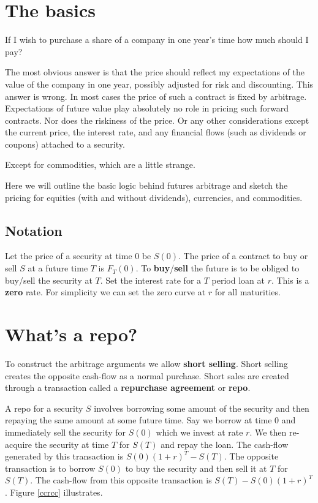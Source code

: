 
\section{The basics}

If I wish to purchase a share of a company in one year's time how much should I pay? 

The most obvious answer is that the price should reflect my expectations of the value of the company in one year, possibly adjusted for risk and discounting. This answer is wrong. In most cases the price of such a contract is fixed by arbitrage. Expectations of future value play absolutely no role in pricing such forward contracts. Nor does the riskiness of the price. Or any other considerations except the current price, the interest rate, and any financial flows (such as dividends or coupons) attached to a security.

Except for commodities, which are a little strange. 

Here we will outline the basic logic behind futures arbitrage and sketch the pricing for equities (with and without dividends), currencies, and commodities. 

\subsection{Notation}
Let the price of a security at time $0$ be $S(0)$. The price of a contract to buy or sell $S$ at a future time $T$ is $F_T(0)$. To \textbf{buy}/\textbf{sell} the future is to be obliged to buy/sell the security at $T$. Set the interest rate for a $T$ period loan at $r$. This is a \textbf{zero} rate. For simplicity we can set the zero curve at $r$ for all maturities. 

\section{What's a repo?}
To construct the arbitrage arguments we allow \textbf{short selling}. Short selling creates the opposite cash-flow as a normal purchase. Short sales are created through a transaction called a \textbf{repurchase agreement} or \textbf{repo}. 

A repo for a security $S$ involves borrowing some amount of the security and then repaying the same amount at some future time. Say we borrow at time 0 and immediately sell the security for $S(0)$ which we invest at rate $r$. We then re-acquire the security at time $T$ for $S(T)$ and repay the loan. The cash-flow generated by this transaction is $S(0)(1+r)^T-S(T)$. The opposite transaction is to borrow $S(0)$ to buy the security and then sell it at $T$ for $S(T)$. The cash-flow from this opposite transaction is $S(T) -S(0)(1+r)^T$. Figure \ref{ccrcc} illustrates. 

